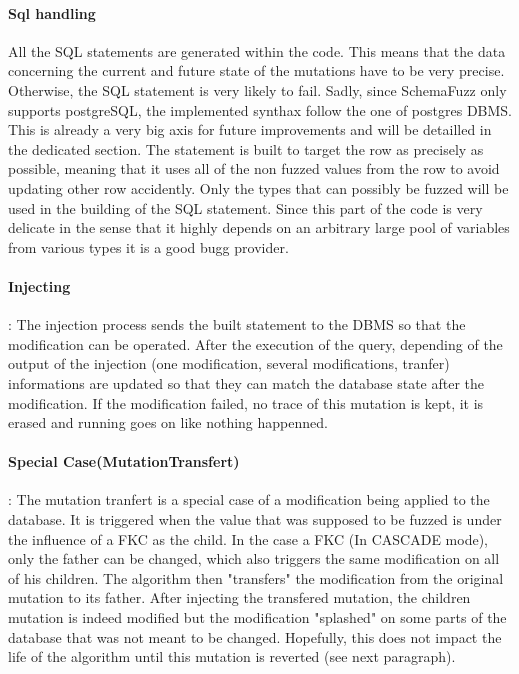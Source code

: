 \documentclass{article}
\begin{document}
				\paragraph{Sql handling}
All the SQL statements are generated within the code. This means that the data concerning the current and future state of the mutations have to be very precise. Otherwise, the SQL statement is very likely to fail. Sadly, since SchemaFuzz only supports postgreSQL, the implemented synthax follow the one of postgres
DBMS. This is already a very big axis for future improvements and will be detailled in the dedicated section.
The statement is built to target the row as precisely as possible, meaning that it uses all of the non fuzzed values from the row to avoid updating other row accidently. Only the types that can possibly be fuzzed will be used in the building of the SQL statement. Since this part of the code is very delicate in the sense that it highly depends on an arbitrary large pool of variables from various types it is a good bugg provider. 
				
				\paragraph{Injecting} :
The injection process sends the built statement to the DBMS so that the modification can be operated. After the execution of the query, depending of the output of the injection (one modification, several modifications, tranfer) informations are updated so that they can match the database state after the modification. If the modification failed, no trace of this mutation is kept, it is erased and running goes on like nothing happenned.  				
				\paragraph{Special Case(MutationTransfert)} :
The mutation tranfert is a special case of a modification being applied to the database.
It is triggered when the value that was supposed to be fuzzed is under the influence of a FKC as the child.
In the case a FKC (In CASCADE mode), only the father can be changed, which also triggers the same modification on all of his children. The algorithm then "transfers" the modification from the original mutation to its father.
After injecting the transfered mutation, the children mutation is indeed modified but the modification "splashed" on some parts of the database that was not meant to be changed.
Hopefully, this does not impact the life of the algorithm until this mutation is reverted (see next paragraph).
\end{document}

